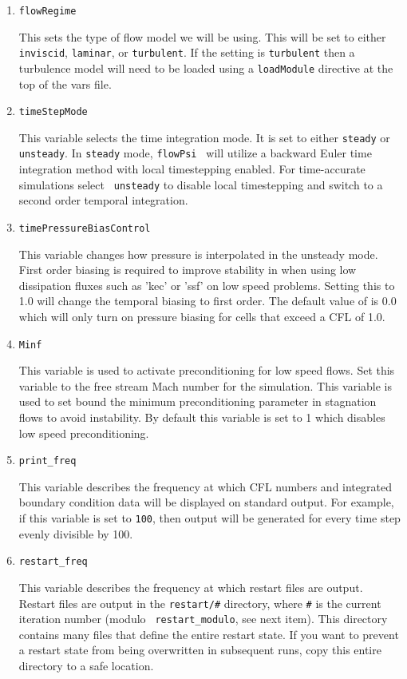 \documentclass{article}
\begin{document}
\begin{enumerate}
\item {\tt flowRegime }

This sets the type of flow model we will be using.  This will be set
to either {\tt inviscid}, {\tt laminar}, or {\tt turbulent}.  If the
setting is {\tt turbulent} then a turbulence model will need to be
loaded using a {\tt loadModule} directive at the top of the vars file.  

\item {\tt timeStepMode }

This variable selects the time integration mode.  It is set to either
{\tt steady} or {\tt unsteady}.  In {\tt steady} mode, {\tt flowPsi }
will utilize a backward Euler time integration method with local
timestepping enabled.  For time-accurate simulations select {\tt
  unsteady} to disable local timestepping and switch to a second order
temporal integration.

\item {\tt timePressureBiasControl}

This variable changes how pressure is interpolated in the unsteady
mode.  First order biasing is required to improve stability in when
using low dissipation fluxes such as 'kec' or 'ssf' on low speed
problems.  Setting this to 1.0 will change the temporal biasing to
first order.  The default value of is 0.0 which will only turn on
pressure biasing for cells that exceed a CFL of 1.0.

\item {\tt Minf}

  This variable is used to activate preconditioning for low speed
  flows.  Set this variable to the free stream Mach number for the
  simulation.  This variable is used to set bound the minimum
  preconditioning parameter in stagnation flows to avoid instability.
  By default this variable is set to 1 which disables low speed
  preconditioning.
  
\item {\tt print\_freq}

  This variable describes the frequency at which CFL numbers and integrated
  boundary condition data will be displayed on standard output.  For
  example, if this variable is set to {\tt 100}, then output will be
  generated for every time step evenly divisible by 100.
  
\item {\tt restart\_freq} 

  This variable describes the frequency at which restart files are output.
  Restart files are output in the {\tt restart/\#} directory, where
  {\tt \#} is the current iteration number (modulo {\tt
    restart\_modulo}, see next item).  This directory contains many
  files that define the entire restart state.  If you want to prevent a
  restart state from being overwritten in subsequent runs, copy this
  entire directory to a safe location.  


\end{enumerate}
\end{document}
